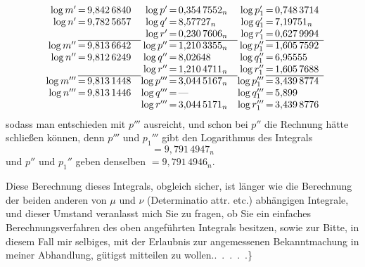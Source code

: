 \[
\begin{array}{r@{\,}c@{\,}l@{\quad}r@{\,}c@{\,}l@{\quad}r@{\,}c@{\,}l}
\log m'&=&9{,}842\,6840&\log p'&=&0{,}354\,7552_n&\log p_1'&=&0{,}748\,3714\\
\log n'&=&9{,}782\,5657&\log q'&=&8{,}57727_n&\log q_1'&=&7{,}19751_n\\
&&&\log r'&=&0{,}230\,7606_n&\log r_1'&=&0{,}627\,9994\\\cline{2-3}\cline{5-6}\cline{8-9}
\log m''&=&9{,}813\,6642&\log p''&=&1{,}210\,3355_n&\log p_1''&=&1{,}605\,7592\\
\log n''&=&9{,}812\,6249&\log q''&=&8{,}02648&\log q_1''&=&6{,}95555\\
&&&\log r''&=&1{,}210\,4711_n&\log r_1''&=&1{,}605\,7688\\\cline{2-3}\cline{5-6}\cline{8-9}
\log m'''&=&9{,}813\,1448&\log p'''&=&3{,}044\,5167_n&\log p_1'''&=&3{,}439\,8774\\
\log n'''&=&9{,}813\,1446&\log q'''&=&\text{—}&\log q_1'''&=&5{,}899\\
&&&\log r'''&=&3{,}044\,5171_n&\log r_1'''&=&3{,}439\,8776
\end{array}
\]
sodass man entschieden mit \(p'''\) ausreicht, und schon bei \(p''\) die Rechnung hätte schließen können, denn \(p'''\) und \(p_1'''\) gibt den Logarithmus des Integrals
\[
=9{,}791\,4947_n
\]
und \(p''\) und \(p_1''\) geben denselben \(=9{,}791\,4946_n\).
\par Diese Berechnung dieses Integrals, obgleich sicher, ist länger wie die Berechnung der beiden anderen von \(\mu\) und \(\nu\) (Determinatio attr. etc.) abhängigen Integrale, und dieser Umstand veranlasst mich Sie zu fragen, ob Sie ein einfaches Berechnungsverfahren des oben angeführten Integrals besitzen, sowie zur Bitte, in diesem Fall mir selbiges, mit der Erlaubnis zur angemessenen Bekanntmachung in meiner Abhandlung, gütigst mitteilen zu wollen.\quad\mbox{. . . . .\}}
\par

